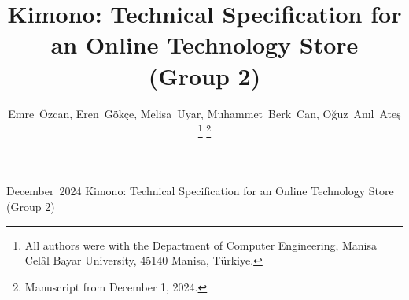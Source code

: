 \documentclass[twoside,a4paper,journal]{IEEEtran}
\begin{document}
%
\title{Kimono: Technical Specification for\\an Online Technology Store (Group 2)}
%
%
%

\author{
Emre~Özcan,
Eren~Gökçe,
Melisa~Uyar,
Muhammet~Berk~Can,
Oğuz~Anıl~Ateş%
\thanks{All authors were with the Department of Computer Engineering,
Manisa Celâl Bayar University, 45140 Manisa, Türkiye.}%
\thanks{Manuscript from December 1, 2024.}%
}

%
%



\markboth%
{December~2024}%
{Kimono: Technical Specification for an Online Technology Store (Group 2)}
%
\end{document}

